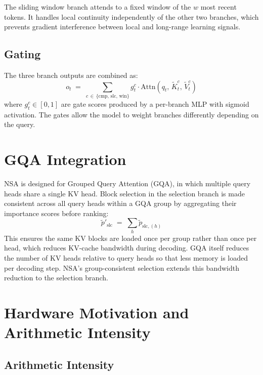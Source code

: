 \documentclass[11pt,letterpaper]{article}
\begin{document}
The sliding window branch attends to a fixed window of the $w$ most recent tokens. It handles
local continuity independently of the other two branches, which prevents gradient interference
between local and long-range learning signals.

\subsection{Gating}

The three branch outputs are combined as:
\[
  o_t \;=\; \sum_{c \,\in\, \{\text{cmp},\,\text{slc},\,\text{win}\}}
            g_t^c \cdot \mathrm{Attn}\!\left(q_t,\,\tilde{K}_t^c,\,\tilde{V}_t^c\right)
\]
where $g_t^c \in [0,1]$ are gate scores produced by a per-branch MLP with sigmoid activation.
The gates allow the model to weight branches differently depending on the query.

\section{GQA Integration}
\label{sec:gqa}

NSA is designed for Grouped Query Attention (GQA), in which multiple query heads share a single
KV head. Block selection in the selection branch is made consistent across all query heads within
a GQA group by aggregating their importance scores before ranking:
\[
  \tilde{p}'_{\text{slc}} \;=\; \sum_{h} \tilde{p}_{\text{slc},(h)}
\]
This ensures the same KV blocks are loaded once per group rather than once per head, which
reduces KV-cache bandwidth during decoding. GQA itself reduces the number of KV heads relative
to query heads so that less memory is loaded per decoding step. NSA's group-consistent selection
extends this bandwidth reduction to the selection branch.

\section{Hardware Motivation and Arithmetic Intensity}
\label{sec:hw}

\subsection{Arithmetic Intensity}
\end{document}
